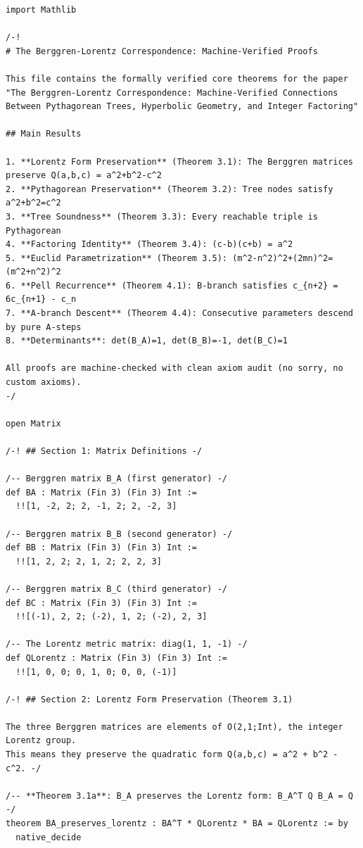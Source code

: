 \documentclass[11pt,openright,twoside]{book}
\theoremstyle{definition}
\begin{document}
\begin{lstlisting}[style=lean]
import Mathlib

/-!
# The Berggren-Lorentz Correspondence: Machine-Verified Proofs

This file contains the formally verified core theorems for the paper
"The Berggren-Lorentz Correspondence: Machine-Verified Connections
Between Pythagorean Trees, Hyperbolic Geometry, and Integer Factoring"

## Main Results

1. **Lorentz Form Preservation** (Theorem 3.1): The Berggren matrices preserve Q(a,b,c) = a^2+b^2-c^2
2. **Pythagorean Preservation** (Theorem 3.2): Tree nodes satisfy a^2+b^2=c^2
3. **Tree Soundness** (Theorem 3.3): Every reachable triple is Pythagorean
4. **Factoring Identity** (Theorem 3.4): (c-b)(c+b) = a^2
5. **Euclid Parametrization** (Theorem 3.5): (m^2-n^2)^2+(2mn)^2=(m^2+n^2)^2
6. **Pell Recurrence** (Theorem 4.1): B-branch satisfies c_{n+2} = 6c_{n+1} - c_n
7. **A-branch Descent** (Theorem 4.4): Consecutive parameters descend by pure A-steps
8. **Determinants**: det(B_A)=1, det(B_B)=-1, det(B_C)=1

All proofs are machine-checked with clean axiom audit (no sorry, no custom axioms).
-/

open Matrix

/-! ## Section 1: Matrix Definitions -/

/-- Berggren matrix B_A (first generator) -/
def BA : Matrix (Fin 3) (Fin 3) Int :=
  !![1, -2, 2; 2, -1, 2; 2, -2, 3]

/-- Berggren matrix B_B (second generator) -/
def BB : Matrix (Fin 3) (Fin 3) Int :=
  !![1, 2, 2; 2, 1, 2; 2, 2, 3]

/-- Berggren matrix B_C (third generator) -/
def BC : Matrix (Fin 3) (Fin 3) Int :=
  !![(-1), 2, 2; (-2), 1, 2; (-2), 2, 3]

/-- The Lorentz metric matrix: diag(1, 1, -1) -/
def QLorentz : Matrix (Fin 3) (Fin 3) Int :=
  !![1, 0, 0; 0, 1, 0; 0, 0, (-1)]

/-! ## Section 2: Lorentz Form Preservation (Theorem 3.1)

The three Berggren matrices are elements of O(2,1;Int), the integer Lorentz group.
This means they preserve the quadratic form Q(a,b,c) = a^2 + b^2 - c^2. -/

/-- **Theorem 3.1a**: B_A preserves the Lorentz form: B_A^T Q B_A = Q -/
theorem BA_preserves_lorentz : BA^T * QLorentz * BA = QLorentz := by
  native_decide


\end{lstlisting}
\end{document}
